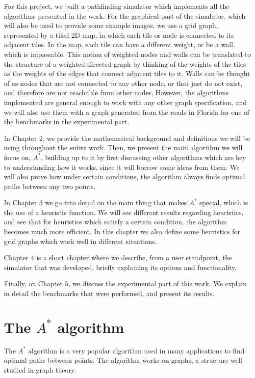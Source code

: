 \documentclass[a4paper,10pt]{report}
\begin{document}
For this project, we built a pathfinding simulator which implements all the algorithms presented in the work. For the graphical part of the simulator, which will also be used to provide some example images, we use a grid graph, represented by a tiled 2D map, in which each tile or node is connected to its adjacent tiles. In the map, each tile can have a different weight, or be a wall, which is impassable. This notion of weighted nodes and walls can be translated to the structure of a weighted directed graph by thinking of the weights of the tiles as the weights of the edges that connect adjacent tiles to it. Walls can be thought of as nodes that are not connected to any other node, or that just do not exist, and therefore are not reachable from other nodes. However, the algorithms implemented are general enough to work with any other graph specification, and we will also use them with a graph generated from the roads in Florida for one of the benchmarks in the experimental part.

In Chapter 2, we provide the mathematical background and definitions we will be using throughout the entire work. Then, we present the main algorithm we will focus on, $A^*$, building up to it by first discussing other algorithms which are key to understanding how it works, since it will borrow some ideas from them. We will also prove how under certain conditions, the algorithm always finds optimal paths between any two points.

In Chapter 3 we go into detail on the main thing that makes $A^*$ special, which is the use of a heuristic function. We will see different results regarding heuristics, and see that for heuristics which satisfy a certain condition, the algorithm becomes much more efficient. In this chapter we also define some heuristics for grid graphs which work well in different situations.

Chapter 4 is a short chapter where we describe, from a user standpoint, the simulator that was developed, briefly explaining its options and functionality.

Finally, on Chapter 5, we discuss the experimental part of this work. We explain in detail the benchmarks that were performed, and present its results.


\chapter{The $A^*$ algorithm}
\label{chapter:algorithms}
The $A^*$ algorithm is a very popular algorithm used in many applications to find optimal paths between points. The algorithm works on graphs, a structure well studied in graph theory.
\end{document}
